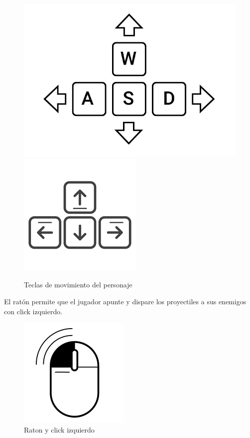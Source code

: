 \begin{figure}[H]
	\centering
	\includegraphics[scale=0.40]{imagenes/teclasWASD.png}
	\includegraphics[scale=0.50]{imagenes/flechas_teclado.png}
	\caption{\label{fig:flechasTeclado}Teclas de movimiento del personaje}
\end{figure}

El ratón permite que el jugador apunte y dispare los proyectiles a sus enemigos con click izquierdo.

\begin{figure}[H]
	\centering
	\includegraphics[scale=0.50]{imagenes/raton.png}
	\caption{\label{fig:raton}Raton y click izquierdo}
\end{figure}

